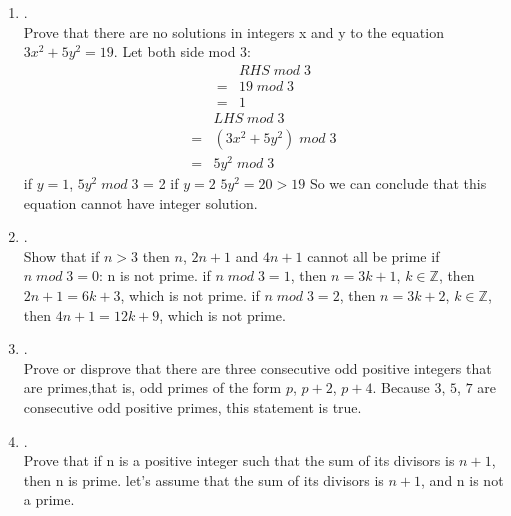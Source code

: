 \documentclass{article}
\theoremstyle{definition}
\theoremstyle{plain}
\begin{document}
\begin {enumerate}[itemindent=30pt,label=\bf Exercise {\arabic*}:]
\subitem \qquad Similarly, we can get $b = qn + j$, $q \in \mathbb{R}$ and $j \in \mathbb{N}, j < n$, i and n are relative prime.
\subitem \qquad Then $ab = pqn^{2} + pjn + qin + ij$
\subitem \qquad Thus:
\begin{align*}
	gcd(ab, n) &= gcd(n, ab\; mod \;n) \\
			   &= gcd(n, (pqn^{2} + pjn + qin + ij)\; mod \;n) \\
			   &= gcd(n,ij\; mod \;n)
\end{align*}
\subitem Because i, n are relative prime and j, n are relative prime, ij and n are relative prime. Therefore, $ij\;mod\;n$ and n are relative prime.
$$gcd(n, ij\; mod \;n) = gcd(ab, n) = 1$$

\item .\\ Prove that there are no solutions in integers x and y to the equation $3x^2+5y^2=19$.
\subitem Let both side mod 3:
\begin{align*}
	&RHS\;mod\;3\\
	=&19\;mod\;3\\
	=& 1 
\end{align*}
\begin{align*}
	&LHS\;mod\;3\\
	=&(3x^2+5y^2)\;mod\;3\\
	=& 5y^2\;mod\;3
\end{align*}
\subitem if $y = 1$, $5y^2\;mod\;3$ = 2
\subitem if $y = 2$  $5y^2 = 20 > 19$
\subitem So we can conclude that this equation cannot have integer solution.
\item .\\Show that if $n>3$ then $n$, $2n+1$ and $4n+1$ cannot all be prime
\subitem if $n \;mod \; 3 = 0$: n is not prime.
\subitem if $n \;mod\; 3 = 1 $, then $n = 3k + 1$, $k \in \mathbb{Z}$, then $2n + 1 = 6k + 3$, which is not prime.
\subitem if $n \;mod\; 3 = 2$, then $n = 3k + 2$, $k \in \mathbb{Z}$, then $4n + 1 = 12k + 9$, which is not prime.
\item .\\Prove or disprove that there are three consecutive odd positive integers that are primes,that is, odd primes of the form $p$, $p+2$, $p+4$.
\subitem Because $3$, $5$, $7$ are consecutive odd positive primes, this statement is true.
\item .\\Prove that if n is a positive integer such that the sum of its divisors is $n+1$, then n is prime.
\subitem let's assume that the sum of its divisors is $n+1$, and n is not a prime.

\end{enumerate}
\end{document}
